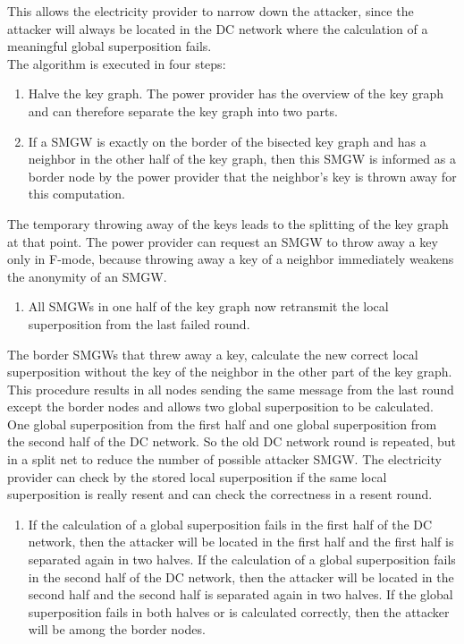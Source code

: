 This allows the electricity provider to narrow down the attacker, since the attacker will always be located in the DC network where the calculation of a meaningful global superposition fails.\\
The algorithm is executed in four steps:
\begin{enumerate}
\item Halve the key graph. 
The power provider has the overview of the key graph and can therefore separate the key graph into two parts. %
\item If a \gls{SMGW} is exactly on the border of the bisected key graph and has a neighbor in the other half of the key graph, then this \gls{SMGW} is informed as a border node by the power provider that the neighbor's key is thrown away for this computation.
\end{enumerate}
The temporary throwing away of the keys leads to the splitting of the key graph at that point. The power provider can request an \gls{SMGW} to throw away a key only in F-mode, because throwing away a key of a neighbor immediately weakens the anonymity of an \gls{SMGW}. 
\begin{enumerate}[resume] 
\item All SMGWs in one half of the key graph now retransmit the local superposition from the last failed round. 
\end{enumerate}
The border \gls{SMGW}s that threw away a key, calculate the new correct local superposition without the key of the neighbor in the other part of the key graph. This procedure results in all nodes sending the same message from the last round except the border nodes and allows two global superposition to be calculated. One global superposition from the first half and one global superposition from the second half of the DC network. So the old DC network round is repeated, but in a split net to reduce the number of possible attacker \gls{SMGW}. The electricity provider can check by the stored local superposition if the same local superposition is really resent and can check the correctness in a resent round. 
\begin{enumerate}[resume]
\item If the calculation of a global superposition fails in the first half of the DC network, then the attacker will be located in the first half and the first half is separated again in two halves. If the calculation of a global superposition fails in the second half of the DC network, then the attacker will be located in the second half and the second half is separated again in two halves. If the global superposition fails in both halves or is calculated correctly, then the attacker will be among the border nodes.
\end{enumerate}
